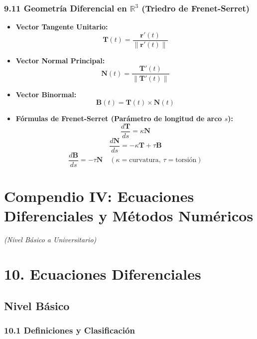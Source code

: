 \documentclass[11pt,a4paper]{article}
\begin{document}
\subsubsection*{9.11 Geometría Diferencial en $\mathbb{R}^3$ (Triedro de Frenet-Serret)}

\begin{itemize}
  \item \textbf{Vector Tangente Unitario:}
  \[
    \mathbf{T}(t) = \frac{\mathbf{r}'(t)}{\|\mathbf{r}'(t)\|}
  \]
  \item \textbf{Vector Normal Principal:}
  \[
    \mathbf{N}(t) = \frac{\mathbf{T}'(t)}{\|\mathbf{T}'(t)\|}
  \]
  \item \textbf{Vector Binormal:}
  \[
    \mathbf{B}(t) = \mathbf{T}(t) \times \mathbf{N}(t)
  \]
  \item \textbf{Fórmulas de Frenet-Serret (Parámetro de longitud de arco $s$):}
  \[
    \frac{d\mathbf{T}}{ds} = \kappa \mathbf{N}
  \]
  \[
    \frac{d\mathbf{N}}{ds} = -\kappa \mathbf{T} + \tau \mathbf{B}
  \]
  \[
    \frac{d\mathbf{B}}{ds} = -\tau \mathbf{N} \quad (\kappa = \text{curvatura}, \, \tau = \text{torsión})
  \]
\end{itemize}

\section*{Compendio IV: Ecuaciones Diferenciales y Métodos Numéricos}

\textit{(Nivel Básico a Universitario)}

\section*{10. Ecuaciones Diferenciales}

\subsection*{Nivel Básico}

\subsubsection*{10.1 Definiciones y Clasificación}
\end{document}
